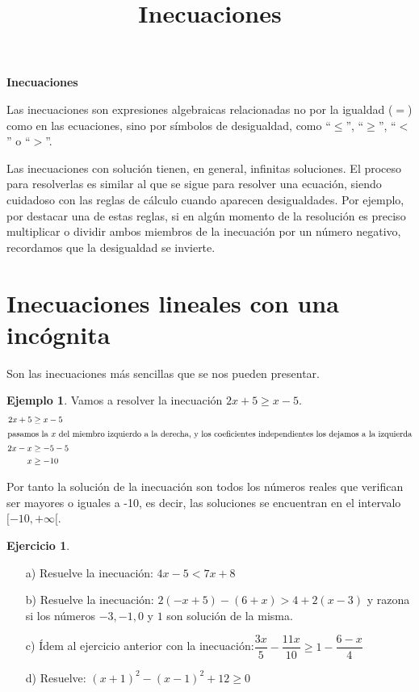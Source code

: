 \documentclass[13pt]{scrartcl}
\theoremstyle{definition}
\newtheorem{ejemplo}{Ejemplo}
\newtheorem{ejercicio}{Ejercicio}
\begin{document}
\title{Inecuaciones}

{\huge \textsf{\textbf{\color{Peach} Inecuaciones}}}

\vspace{1em}

Las inecuaciones son  expresiones algebraicas relacionadas no por la igualdad ($=$) como en 
las ecuaciones, sino por símbolos de desigualdad, como  ``$\le$'', ``$\ge$'', ``$<$'' o ``$>$''. 

Las inecuaciones con solución tienen, en general, infinitas soluciones. El proceso para 
resolverlas es similar al que se sigue para resolver una ecuación, siendo cuidadoso con las 
reglas de cálculo cuando aparecen desigualdades. Por ejemplo, por destacar una de estas 
reglas, si en algún momento de la resolución es preciso multiplicar o dividir ambos 
miembros de la inecuación por un número negativo, recordamos que la desigualdad 
se invierte.



\section{Inecuaciones lineales con una incógnita}





Son las inecuaciones más sencillas que se nos pueden presentar.

\begin{ejemplo} Vamos a resolver la inecuación $2x+5 \ge x-5$. 
\begin{align*}
2x+5 & \ge x-5 \\
\intertext{pasamos la $x$ del miembro izquierdo a la derecha, y los coeficientes independientes los dejamos a la izquierda}
2x-x & \ge -5-5 \\
x &\ge -10
\end{align*}
\end{ejemplo}
Por tanto la solución de la inecuación son todos los números reales que verifican ser mayores o iguales a -10, es decir, las soluciones se encuentran en el intervalo $[-10,+\infty[$.

\begin{ejercicio} $ $
\begin{enumerate}
\item[a)] Resuelve la inecuación: $4x-5 < 7x+8$
\item[b)] Resuelve la inecuación: $2(-x+5)-(6+x)>4+2(x-3)$  y razona si los números $-3, -1, 0$ y $ 1$ son solución de la misma.
\item[c)] Ídem al ejercicio anterior con la inecuación:$\dfrac{3x}{5}-\dfrac{11x}{10} \ge 1-\dfrac{6-x}{4}$
\item[d)] Resuelve: $(x+1)^2-(x-1)^2+12 \ge 0$
\end{enumerate}
\end{ejercicio}
\end{document}
